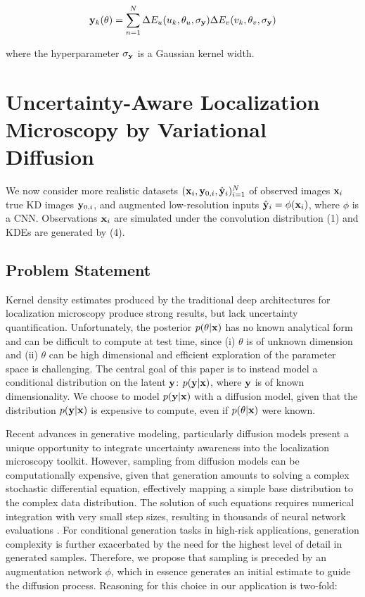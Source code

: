 \documentclass{article}
\begin{document}
\begin{equation}
\bold{y}_{k}(\theta) = \sum_{n=1}^{N}\Delta E_{u}(u_{k},\theta_{u},\sigma_{\bold{y}}) \Delta E_{v}(v_{k},\theta_{v},\sigma_{\bold{y}})
\end{equation}

where the hyperparameter $\sigma_{\bold{y}}$ is a Gaussian kernel width. 

\section{Uncertainty-Aware Localization Microscopy by Variational Diffusion}

We now consider more realistic datasets $(\bold{x}_i,\bold{y}_{0,i},\hat{\bold{y}}_{i})_{i=1}^{N}$ of observed images $\bold{x}_i$ true KD images $\bold{y}_{0,i}$, and augmented low-resolution inputs $\hat{\bold{y}}_{i}=\phi(\bold{x}_{i})$, where $\phi$ is a CNN. Observations $\bold{x}_i$ are simulated under the convolution distribution (1) and KDEs are generated by (4).

\subsection{Problem Statement}

Kernel density estimates produced by the traditional deep architectures for localization microscopy produce strong results, but lack uncertainty quantification. Unfortunately, the posterior $p(\theta|\bold{x})$ has no known analytical form and can be difficult to compute at test time, since (i) $\theta$ is of unknown dimension and (ii) $\theta$ can be high dimensional and efficient exploration of the parameter space is challenging. The central goal of this paper is to instead model a conditional distribution on the latent $\bold{y}$: $p(\bold{y}|\bold{x})$, where $\bold{y}$ is of known dimensionality. We choose to model $p(\bold{y}|\bold{x})$ with a diffusion model, given that the distribution $p(\bold{y}|\bold{x})$ is expensive to compute, even if $p(\theta|\bold{x})$ were known.

Recent advances in generative modeling, particularly diffusion models \citep{SohlDickstein2015,Ho2020,Song2021} present a unique opportunity to integrate uncertainty awareness into the localization microscopy toolkit. However, sampling from diffusion models can be computationally expensive, given that generation amounts to solving a complex stochastic differential equation, effectively mapping a simple base distribution to the complex data distribution. The solution of such equations requires numerical integration with very small step sizes, resulting in thousands of neural network evaluations \citep{Saharia2021,Vahdat2021}. For conditional generation tasks in high-risk applications, generation complexity is further exacerbated by the need for the highest level of detail in generated samples. Therefore, we propose that sampling is preceded by an augmentation network $\phi$, which in essence generates an initial estimate to guide the diffusion process. Reasoning for this choice in our application is two-fold:
\end{document}
